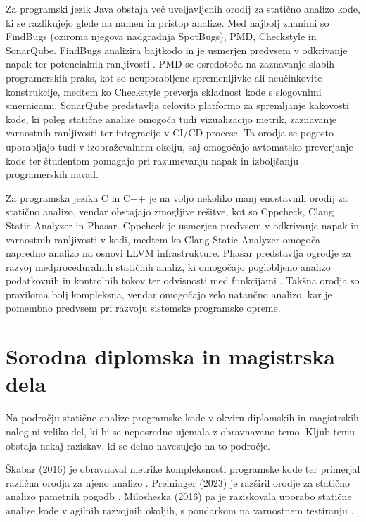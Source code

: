 \documentclass[a4paper,12pt,openright]{book}
\begin{document}
Za programski jezik Java obstaja več uveljavljenih orodij za statično analizo kode, ki se razlikujejo glede na namen in pristop analize. Med najbolj znanimi so FindBugs (oziroma njegova nadgradnja SpotBugs), PMD, Checkstyle in SonarQube. FindBugs analizira bajtkodo in je usmerjen predvsem v odkrivanje napak ter potencialnih ranljivosti \cite{ayewah2008using}. PMD se osredotoča na zaznavanje slabih programerskih praks, kot so neuporabljene spremenljivke ali neučinkovite konstrukcije, medtem ko Checkstyle preverja skladnost kode s slogovnimi smernicami. SonarQube predstavlja celovito platformo za spremljanje kakovosti kode, ki poleg statične analize omogoča tudi vizualizacijo metrik, zaznavanje varnostnih ranljivosti ter integracijo v CI/CD procese. Ta orodja se pogosto uporabljajo tudi v izobraževalnem okolju, saj omogočajo avtomatsko preverjanje kode ter študentom pomagajo pri razumevanju napak in izboljšanju programerskih navad.

Za programska jezika C in C++ je na voljo nekoliko manj enostavnih orodij za statično analizo, vendar obstajajo zmogljive rešitve, kot so Cppcheck, Clang Static Analyzer in Phasar. Cppcheck je usmerjen predvsem v odkrivanje napak in varnostnih ranljivosti v kodi, medtem ko Clang Static Analyzer omogoča napredno analizo na osnovi LLVM infrastrukture. Phasar predstavlja ogrodje za razvoj medproceduralnih statičnih analiz, ki omogočajo poglobljeno analizo podatkovnih in kontrolnih tokov ter odvisnosti med funkcijami \cite{schubert2019phasar}. Takšna orodja so praviloma bolj kompleksna, vendar omogočajo zelo natančno analizo, kar je pomembno predvsem pri razvoju sistemske programske opreme.

\section{Sorodna diplomska in magistrska dela}

Na področju statične analize programske kode v okviru diplomskih in magistrskih nalog ni veliko del, ki bi se neposredno ujemala z obravnavano temo. Kljub temu obstaja nekaj raziskav, ki se delno navezujejo na to področje.

Škabar (2016) je obravnaval metrike kompleksnosti programske kode ter primerjal različna orodja za njeno analizo \cite{ŠKABAR_2016}. Preininger (2023) je razširil orodje za statično analizo pametnih pogodb \cite{PREININGER_2023}. Milosheska (2016) pa je raziskovala uporabo statične analize kode v agilnih razvojnih okoljih, s poudarkom na varnostnem testiranju \cite{MILOSHESKA_2016}.
\end{document}
